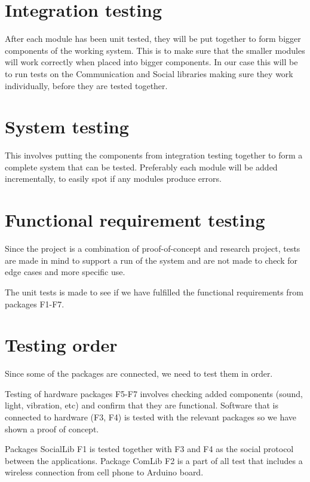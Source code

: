 \section{Integration testing}
After each module has been unit tested, they will be put together to form bigger components 
of the working system. This is to make sure that the smaller modules will work correctly when placed 
into bigger components. In our case this will be to run tests on the Communication and Social libraries
making sure they work individually, before they are tested together.

\section{System testing}
This involves putting the components from integration testing together to form a complete system that 
can be tested. Preferably each module will be added incrementally, to easily spot if any modules produce errors.

\section{Functional requirement testing}
Since the project is a combination of proof-of-concept and research project, tests are made
in mind to support a run of the system and are not made to check for edge
cases and more specific use.

The unit tests is made to see if we have fulfilled the functional requirements from packages F1-F7.

\section{Testing order}
Since some of the packages are connected, we need to test them in order.

Testing of hardware packages F5-F7 involves checking added components (sound, light, vibration, etc)
and confirm that they are functional. Software that is connected to hardware (F3, F4) is tested
with the relevant packages so we have shown a proof of concept.

Packages SocialLib F1 is tested together with F3 and F4 as the social protocol between the applications.
Package ComLib F2 is a part of all test that includes a wireless connection from cell phone to Arduino board.

